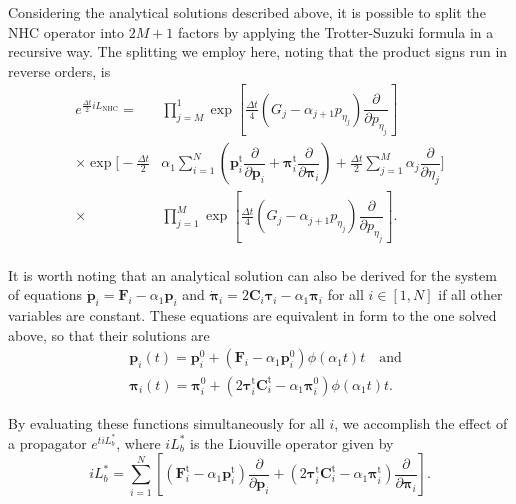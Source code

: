 \documentclass[aip,jcp,reprint,amsmath,amssymb]{revtex4-1}
\newcommand{\mt}[1]{\boldsymbol{\mathbf{#1}}}           %
\newcommand{\vt}[1]{\boldsymbol{\mathbf{#1}}}           %
\newcommand{\tr}[1]{#1^\text{t}}                               %
\newcommand{\diff}[2]{\dfrac{\partial #1}{\partial #2}} %
\begin{document}
Considering the analytical solutions described above, it is possible to split the NHC operator into $2M+1$ factors by applying the Trotter-Suzuki formula in a recursive way. The splitting we employ here, noting that the product signs run in reverse orders, is
\begin{align*}
e^{\frac{\Delta t}{2} i\!L_\text{NHC}} = &\prod_{j=M}^1 \exp \left[ \frac{\Delta t}{4} (G_j - \alpha_{j+1} p_{\eta_j}) \diff{}{p_{\eta_j}} \right] \\
\times \exp \Bigg[ -\frac{\Delta t}{2} &\alpha_1 \sum_{i=1}^N \left(\tr{\vt p}_i \diff{}{\vt p_i} + \tr{\vt \pi}_i \diff{}{\vt \pi_i}\right) + \frac{\Delta t}{2} \sum_{j=1}^M \alpha_j \diff{}{\eta_j} \Bigg] \\
\times &\prod_{j=1}^M \exp \left[\frac{\Delta t}{4} (G_j - \alpha_{j+1} p_{\eta_j}) \diff{}{p_{\eta_j}} \right].\\
\end{align*}

It is worth noting that an analytical solution can also be derived for the system of equations $\dot{\vt p}_i = {\vt F}_i - \alpha_1 \vt p_i$ and $\dot{\vt \pi}_i = 2 \mt C_i \vt \tau_i - \alpha_1 \vt \pi_i$ for all $i \in [1,N]$ if all other variables are constant. These equations are equivalent in form to the one solved above, so that their solutions are
\begin{subequations}
\label{eq:solution_momenta}
\begin{align}
&{\vt p}_i(t) = {\vt p}_i^0 + \left({\vt F}_i - \alpha_1 {\vt p}_i^0 \right) \phi\left(\alpha_1 t \right) t \quad \text{and} \label{eq:solution_p} \\
&{\vt \pi}_i(t) = {\vt \pi}_i^0 + \left(2 \tr{\vt \tau}_i \tr{\mt C}_i - \alpha_1 {\vt \pi}_i^0 \right) \phi\left(\alpha_1 t \right) t. \label{eq:solution_pi}
\end{align}
\end{subequations}

By evaluating these functions simultaneously for all $i$, we accomplish the effect of a propagator $e^{t i\!L_b^\ast}$, where $i\!L_b^\ast$ is the Liouville operator given by
\[
i\!L_b^\ast = \sum_{i=1}^N \left[ \left( \tr{\vt F}_i - \alpha_1 \tr{\vt p}_i \right) \diff{}{\vt p_i} + \left(2 \tr{\vt \tau}_i \tr{\mt C}_i - \alpha_1 \tr{\vt \pi}_i \right) \diff{}{\vt \pi_i} \right].
\]
\end{document}
